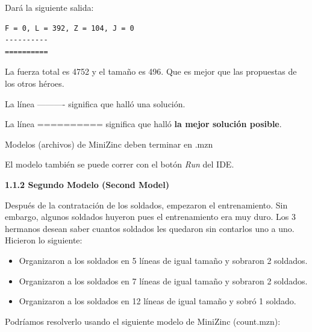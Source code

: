 \documentclass[12pt]{article}
\begin{document}
\begin{justify}
Dará la siguiente salida:
\end{justify}

\begin{Verbatim}
F = 0, L = 392, Z = 104, J = 0
----------
==========
\end{Verbatim}

\begin{justify}
La fuerza total es 4752 y el tamaño es 496. Que es mejor que las propuestas de los otros héroes.
\end{justify}

\begin{justify}
La línea ---------- significa que halló una solución.
\end{justify}

\begin{justify}
La línea ========== significa que halló \textbf{la mejor solución posible}.
\end{justify}

\begin{justify}
Modelos (archivos) de MiniZinc deben terminar en .mzn
\end{justify}

\begin{justify}
El modelo también se puede correr con el botón \textit{Run} del IDE.
\end{justify}

\newpage

\textbf{1.1.2 Segundo Modelo (Second Model)}

\begin{justify}
Después de la contratación de los soldados, empezaron el entrenamiento. Sin embargo, algunos soldados huyeron pues el entrenamiento era muy duro. Los 3 hermanos desean saber cuantos soldados les quedaron sin contarlos uno a uno. Hicieron lo siguiente:
\end{justify}

\begin{itemize}
\item Organizaron a los soldados en 5 líneas de igual tamaño y sobraron 2 soldados.
\item Organizaron a los soldados en 7 líneas de igual tamaño y sobraron 2 soldados.
\item Organizaron a los soldados en 12 líneas de igual tamaño y sobró 1 soldado.
\end{itemize}

\begin{justify}
Podríamos resolverlo usando el siguiente modelo de MiniZinc (count.mzn):
\end{justify}
\end{document}
